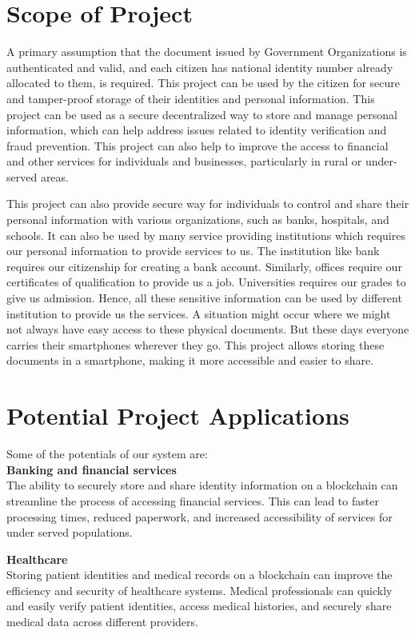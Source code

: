 \section{Scope of Project}

A primary assumption that the document issued by Government Organizations is authenticated and valid, and each citizen  has national identity number already allocated to them, is required. This project can be used by the citizen for secure and tamper-proof storage of their identities and personal information. This project can be used as a secure decentralized way to store and manage personal information, which can help address issues related to identity verification and fraud prevention. This project can also help to improve the access to financial and other services for individuals and businesses, particularly in rural or under-served areas.

This project can also provide secure way for individuals to control and share their personal information with various organizations, such as banks, hospitals, and schools. It can also be used by many service providing institutions which requires our personal information to provide services to us. The institution like bank requires our citizenship for creating a bank account. Similarly, offices require our certificates of qualification to provide us a job. Universities requires our grades to give us admission. Hence, all these sensitive information can be used by different institution to provide us the services. A situation might occur where we might not always have easy access to these physical documents. But these days everyone carries their smartphones wherever they go. This project allows storing these documents in a smartphone, making it more accessible and easier to share.

\section{Potential Project Applications}
Some of the potentials of our system are:\\
\textbf{Banking and financial services}\\
     The ability to securely store and share identity information on a blockchain can streamline the process of accessing financial services. This can lead to faster processing times, reduced paperwork, and increased accessibility of services for under served populations.

\textbf{Healthcare}\\
     Storing patient identities and medical records on a blockchain can improve the efficiency and security of healthcare systems. Medical professionals can quickly and easily verify patient identities, access medical histories, and securely share medical data across different providers.

